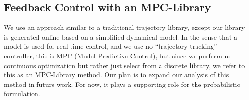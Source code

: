 \documentclass{llncs}
\begin{document}
\subsection{Feedback Control with an MPC-Library}

We use an approach similar to a traditional trajectory library, except our library is generated online based on a simplified dynamical model.  In the sense that a model is used for real-time control, and we use no ``trajectory-tracking'' controller, this is MPC (Model Predictive Control), but since we perform no continuous optimization but rather just select from a discrete library, we refer to this as an MPC-Library method.  
Our plan is to expand our analysis of this method in future work.  For now, it plays a supporting role for the probabilistic formulation.
\end{document}

